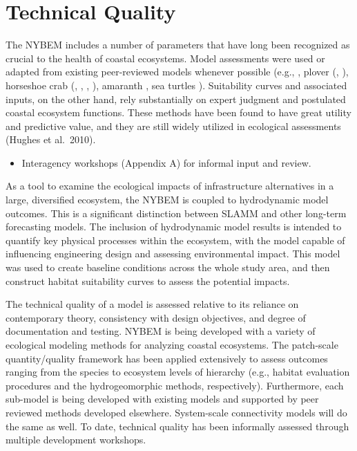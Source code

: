 \documentclass[
]{book}
\providecommand{\tightlist}{%
  \setlength{\itemsep}{0pt}\setlength{\parskip}{0pt}}
\begin{document}
\hypertarget{technical-quality}{%
\section{Technical Quality}\label{technical-quality}}

The NYBEM includes a number of parameters that have long been recognized as crucial to the health of coastal ecosystems. Model assessments were used or adapted from existing peer-reviewed models whenever possible (e.g., \citep{usace_evaluation_2009}, plover (\citep{farmer_habitat_2000}, \citep{seavey_effect_2011}), horseshoe crab (\citep{avissar_modeling_2006}, \citep{nancy_jackson_armoring_2010}, \citep{lathrope_mapping_2013}, \citep{brady_habitat_1996}), amaranth \citep{sellars_habitat_2007}, sea turtles \citep{dunkin_spatially_2016}).
Suitability curves and associated inputs, on the other hand, rely substantially on expert judgment and postulated coastal ecosystem functions. These methods have been found to have great utility and predictive value, and they are still widely utilized in ecological assessments (Hughes et al.~2010).

\begin{itemize}
\tightlist
\item
  Interagency workshops (Appendix A) for informal input and review.
\end{itemize}

As a tool to examine the ecological impacts of infrastructure alternatives in a large, diversified ecosystem, the NYBEM is coupled to hydrodynamic model outcomes. This is a significant distinction between SLAMM and other long-term forecasting models. The inclusion of hydrodynamic model results is intended to quantify key physical processes within the ecosystem, with the model capable of influencing engineering design and assessing environmental impact. This model was used to create baseline conditions across the whole study area, and then construct habitat suitability curves to assess the potential impacts.

The technical quality of a model is assessed relative to its reliance on contemporary theory, consistency with design objectives, and degree of documentation and testing. NYBEM is being developed with a variety of ecological modeling methods for analyzing coastal ecosystems. The patch-scale quantity/quality framework has been applied extensively to assess outcomes ranging from the species to ecosystem levels of hierarchy (e.g., habitat evaluation procedures and the hydrogeomorphic methods, respectively). Furthermore, each sub-model is being developed with existing models and supported by peer reviewed methods developed elsewhere. System-scale connectivity models will do the same as well. To date, technical quality has been informally assessed through multiple development workshops.
\end{document}

